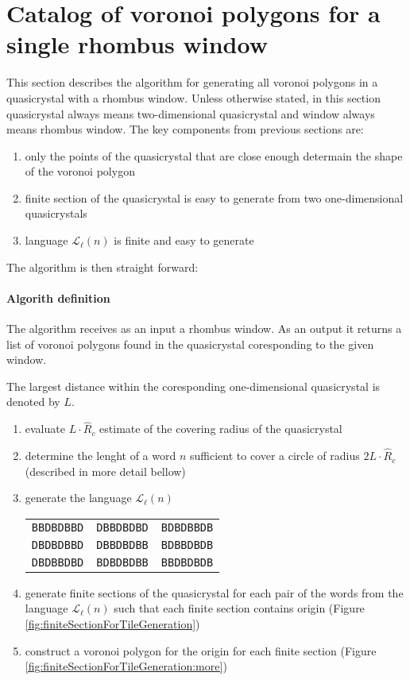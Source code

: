 \documentclass[text.tex]{subfiles}
\begin{document}
\section{Catalog of voronoi polygons for a single rhombus window}
This section describes the algorithm for generating all voronoi polygons in a quasicrystal with a rhombus window. Unless otherwise stated, in this section quasicrystal always means two-dimensional quasicrystal and window always means rhombus window. The key components from previous sections are:

\begin{enumerate}
\item only the points of the quasicrystal that are close enough determain the shape of the voronoi polygon
\item finite section of the quasicrystal is easy to generate from two one-dimensional quasicrystals
\item language $\mathcal{L}_{\ell}(n)$ is finite and easy to generate
\end{enumerate}

The algorithm is then straight forward:

\paragraph{Algorith definition} The algorithm receives as an input a rhombus window. As an output it returns a list of voronoi polygons found in the quasicrystal coresponding to the given window.

The largest distance within the coresponding one-dimensional quasicrystal is denoted by $L$. 

\begin{enumerate}
\item evaluate $L\cdot\hat{R}_c$ estimate of the covering radius of the quasicrystal
\item determine the lenght of a word $n$ sufficient to cover a circle of radius $2L\cdot\hat{R}_c$ (described in more detail bellow)
\item generate the language $\mathcal{L}_{\ell}(n)$

\begin{tabular}{ccc}
\texttt{BBDBDBBD} & \texttt{DBBDBDBD} & \texttt{BDBDBBDB} \\
\texttt{DBDBDBBD} & \texttt{DBBDBDBB} & \texttt{BDBBDBDB} \\
\texttt{DBDBBDBD} & \texttt{BDBDBDBB} & \texttt{BBDBDBDB} \\
\end{tabular}
\item generate finite sections of the quasicrystal for each pair of the words from the language $\mathcal{L}_{\ell}(n)$ such that each finite section contains origin (Figure \ref{fig:finiteSectionForTileGeneration})
\item construct a voronoi polygon for the origin for each finite section (Figure \ref{fig:finiteSectionForTileGeneration:more})
\end{enumerate}
\end{document}

